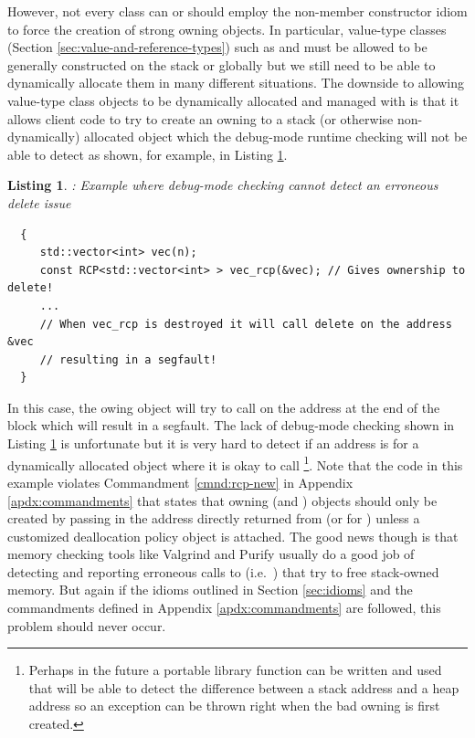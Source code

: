 \documentclass[pdf,ps2pdf,11pt]{SANDreport}
\newtheorem{listing}{Listing}
\begin{document}
However, not every class can or should employ the non-member
constructor idiom to force the creation of strong owning {}
objects.  In particular, value-type classes (Section
{}\ref{sec:value-and-reference-types}) such as {} and
{} must be allowed to be generally constructed on
the stack or globally but we still need to be able to dynamically
allocate them in many different situations.  The downside to allowing
value-type class objects to be dynamically allocated and managed with
{} is that it allows client code to try to create an owning
{} to a stack (or otherwise non-dynamically) allocated object
which the debug-mode runtime checking will not be able to detect as
shown, for example, in Listing {}\ref{listing:bad-delete-error}.


{}\begin{listing}: Example where debug-mode checking cannot detect an
erroneous delete issue
\label{listing:bad-delete-error}
{\small\begin{verbatim}
  {
     std::vector<int> vec(n);
     const RCP<std::vector<int> > vec_rcp(&vec); // Gives ownership to delete!
     ...
     // When vec_rcp is destroyed it will call delete on the address &vec
     // resulting in a segfault!
  }
\end{verbatim}}
\end{listing}


In this case, the owing {} object will try
to call {} on the address {} at the end of the
block which will result in a segfault.  The lack of debug-mode
checking shown in Listing {}\ref{listing:bad-delete-error} is
unfortunate but it is very hard to detect if an address is for a
dynamically allocated object where it is okay to call
{}\footnote{Perhaps in the future a portable library
function can be written and used that will be able to detect the
difference between a stack address and a heap address so an exception
can be thrown right when the bad owning {} is first created.
}.  Note that the code in this example violates Commandment
{}\ref{cmnd:rcp-new} in Appendix {}\ref{apdx:commandments} that states
that owning {} (and {}) objects should only be
created by passing in the address directly returned from {}
(or {} for {}) unless a customized
deallocation policy object is attached.  The good news though is that
memory checking tools like Valgrind and Purify usually do a good job
of detecting and reporting erroneous calls to {} (i.e.\
{}) that try to free stack-owned memory.  But again if
the idioms outlined in Section {}\ref{sec:idioms} and the commandments
defined in Appendix {}\ref{apdx:commandments} are followed, this
problem should never occur.
\end{document}

